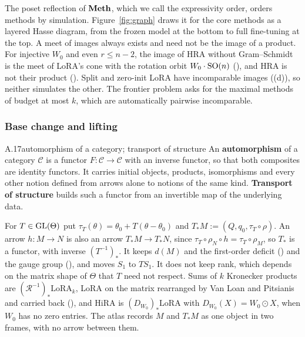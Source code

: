 The poset reflection of $\mathbf{Meth}$, which we call the expressivity order, orders methods by simulation.
Figure~\ref{fig:graph} draws it for the core methods as a layered Hasse diagram, from the frozen model at the bottom to
full fine-tuning at the top. A meet of images always exists and need not be the image of a product. For injective $W_0$
and even $r\le n-2$, the image of HRA without Gram--Schmidt is the meet of LoRA's cone with the rotation orbit
$W_0\cdot\mathrm{SO}(n)$ (), and HRA is not their product (). Split and zero-init LoRA have
incomparable images ((d)), so neither simulates the other. The frontier problem asks for the
maximal methods of budget at most $k$, which are automatically pairwise incomparable.


\subsubsection*{Base change and lifting}

\begin{bgentry}{A.17}{automorphism of a category; transport of structure}
An \textbf{automorphism} of a category $\mathcal C$ is a functor $F:\mathcal C\to\mathcal C$ with an inverse functor, so
that both composites are identity functors. It carries initial objects, products, isomorphisms and every other notion
defined from arrows alone to notions of the same kind. \textbf{Transport of structure} builds such a functor from an
invertible map of the underlying data.
\end{bgentry}

For $T\in\mathrm{GL}(\Theta)$ put $\tau_T(\theta)=\theta_0+T(\theta-\theta_0)$ and $T_*M:=(Q,q_0,\tau_T\circ\rho)$. An arrow
$h:M\to N$ is also an arrow $T_*M\to T_*N$, since $\tau_T\circ\rho_N\circ h=\tau_T\circ\rho_M$, so $T_*$ is a functor,
with inverse $(T^{-1})_*$. It keeps $d(M)$ and the first-order deficit () and the gauge group (),
and moves $S_1$ to $TS_1$. It does not keep rank, which depends on the matrix shape of $\Theta$ that $T$ need not
respect. Sums of $k$ Kronecker products are $(\mathcal R^{-1})_*\mathrm{LoRA}_k$, LoRA on the matrix rearranged by Van
Loan and Pitsianis and carried back (), and HiRA \citep{huang2025hira} is $(D_{W_0})_*\mathrm{LoRA}$ with
$D_{W_0}(X)=W_0\odot X$, when $W_0$ has no zero entries. The atlas records $M$ and $T_*M$ as one object in two frames,
with no arrow between them.

